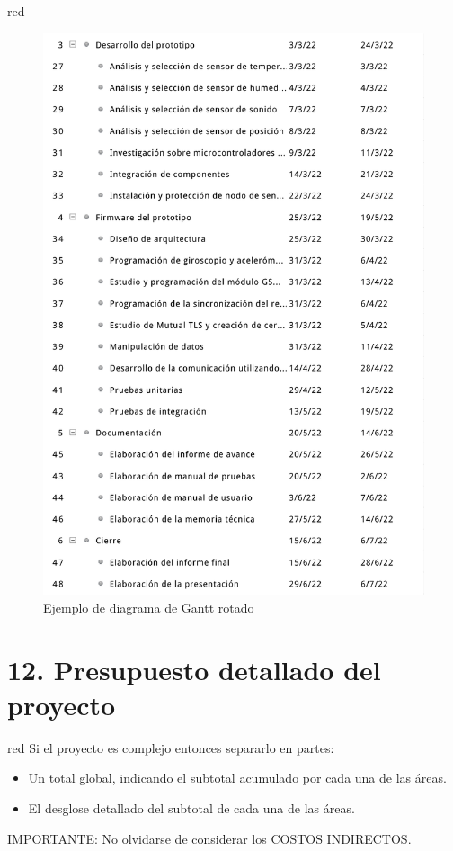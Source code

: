 \documentclass[
11pt, %
codirector, %
]{charter}
\begin{document}
\begin{consigna}{red}
\begin{landscape}
\begin{figure}[htpb]
\centering 
\includegraphics[height=.85\textheight]{./Figuras/Gantt-2.png}
\caption{Ejemplo de diagrama de Gantt rotado}
\label{fig:diagGantt}
\end{figure}

\end{landscape}

\end{consigna}


\section{12. Presupuesto detallado del proyecto}
\label{sec:presupuesto}

\begin{consigna}{red}
Si el proyecto es complejo entonces separarlo en partes:
\begin{itemize}
	\item Un total global, indicando el subtotal acumulado por cada una de las áreas.
	\item El desglose detallado del subtotal de cada una de las áreas.
\end{itemize}

IMPORTANTE: No olvidarse de considerar los COSTOS INDIRECTOS.

\end{consigna}
\end{document}
